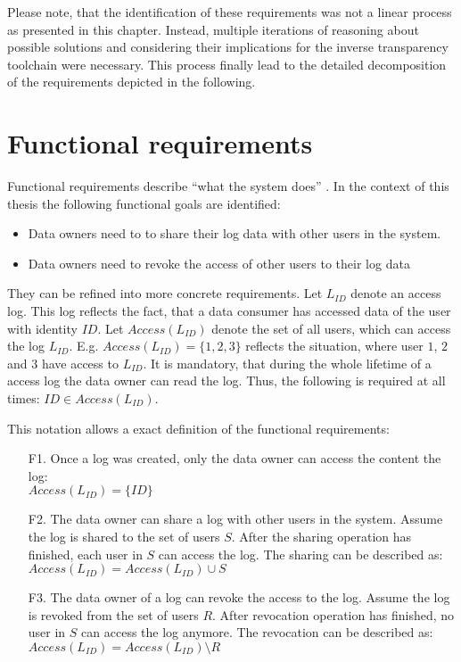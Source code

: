 \documentclass[../main.tex]{subfiles}
\begin{document}
Please note, that the identification of these requirements was not a linear process as presented in this chapter.
Instead, multiple iterations of reasoning about possible solutions and considering their implications for the inverse transparency toolchain were necessary.
This process finally lead to the detailed decomposition of the requirements depicted in the following.


\newpage
\section{Functional requirements}\label{functional-requriements}
Functional requirements describe \enquote{what the system does} \cite[11]{Mylopoulos1992}.
In the context of this thesis the following functional goals are identified:
\begin{itemize}
    \item Data owners need to to share their log data with other users in the system.
    \item Data owners need to revoke the access of other users to their log data
\end{itemize}

They can be refined into more concrete requirements. 
Let $L_{ID}$ denote an access log. 
This log reflects the fact, that a data consumer has accessed data of the user with identity $ID$.
Let $Access(L_{ID})$ denote the set of all users, which can access the log $L_{ID}$.
E.g. $Access(L_{ID}) =\{1,2,3\}$ reflects the situation, where user $1$, $2$ and $3$ have access to $L_{ID}$.
It is mandatory, that during the whole lifetime of a access log the data owner can read the log.
Thus, the following is required at all times: $ ID \in Access(L_{ID})$.

This notation allows a exact definition of the functional requirements:

\begin{enumerate}
    \item [F1.] Once a log was created, only the data owner can access the content the log:
    \\$Access(L_{ID}) =\{ID\}$
    \item [F2.] The data owner can share a log with other users in the system. 
    Assume the log is shared to the set of users $S$.
    After the sharing operation has finished, each user in $S$ can access the log.
    The sharing can be described as: 
    \\$Access(L_{ID}) = Access(L_{ID}) \cup S$
    \item [F3.] The data owner of a log can revoke the access to the log.
    Assume the log is revoked from the set of users $R$.
    After revocation operation has finished, no user in $S$ can access the log anymore.
    The revocation can be described as: 
    \\$Access(L_{ID}) = Access(L_{ID}) \setminus R$

\end{enumerate}
\end{document}

